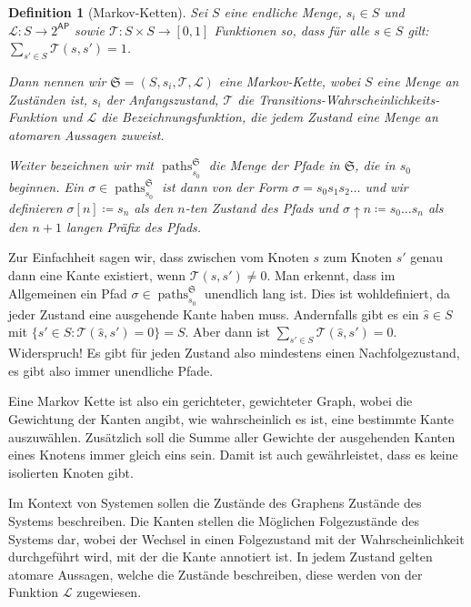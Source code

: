 \documentclass{lni}
\theoremstyle{def_style}
\newtheorem{definition}{Definition}[section]
\theoremstyle{break}
\newcommand{\paths}[2]{\operatorname{paths}^{#1}_{#2}}
\begin{document}
\begin{definition}[Markov-Ketten]
	Sei $S$ eine endliche Menge, $s_i\in S$ und $\mathcal{L}:S\to 2^\mathsf{AP}$ sowie $\mathcal{T}:S\times S \to [0,1]$ Funktionen so, dass für alle $s\in S$ gilt: $\sum_{s'\in S}\mathcal{T}(s,s')=1$.
	
	Dann nennen wir $\mathfrak{S}=(S, s_i, \mathcal{T}, \mathcal{L})$ eine Markov-Kette, wobei $S$ eine Menge an Zuständen ist, $s_i$ der Anfangszustand, $\mathcal{T}$ die Transitions-Wahrscheinlichkeits-Funktion und $\mathcal{L}$ die Bezeichnungsfunktion, die jedem Zustand eine Menge an atomaren Aussagen zuweist.
	
	Weiter bezeichnen wir mit $\paths{\mathfrak{S}}{s_0}$ die Menge der Pfade in $\mathfrak{S}$, die in $s_0$ beginnen. 
	Ein $\sigma\in \paths{\mathfrak{S}}{s_0}$ ist dann von der Form $\sigma=s_0s_1s_2\dots$ und wir definieren $\sigma[n]\coloneqq s_n$ als den $n$-ten Zustand des Pfads und $\sigma\uparrow n\coloneqq s_0\dots s_n$ als den $n+1$ langen Präfix des Pfads.
	\cite{hansson1994logic}
\end{definition}

Zur Einfachheit sagen wir, dass zwischen vom Knoten $s$ zum Knoten $s'$ genau dann eine Kante existiert, wenn $\mathcal{T}(s, s') \neq 0$.
Man erkennt, dass im Allgemeinen ein Pfad $\sigma\in \paths{\mathfrak{S}}{s_0}$ unendlich lang ist. 
Dies ist wohldefiniert, da jeder Zustand eine ausgehende Kante haben muss. Andernfalls gibt es ein $\hat s\in S$ mit $\{s'\in S :\mathcal{T}(\hat s, s')= 0 \} = S$. Aber dann ist $\sum_{s'\in S}\mathcal{T}(\hat s, s')=0$. Widerspruch! Es gibt für jeden Zustand also mindestens einen Nachfolgezustand, es gibt also immer unendliche Pfade.

Eine Markov Kette ist also ein gerichteter, gewichteter Graph, wobei die Gewichtung der Kanten angibt, wie wahrscheinlich es ist, eine bestimmte Kante auszuwählen. Zusätzlich soll die Summe aller Gewichte der ausgehenden Kanten eines Knotens immer gleich eins sein. Damit ist auch gewährleistet, dass es keine isolierten Knoten gibt.

Im Kontext von Systemen sollen die Zustände des Graphens Zustände des Systems beschreiben. Die Kanten stellen die Möglichen Folgezustände des Systems dar, wobei der Wechsel in einen Folgezustand mit der Wahrscheinlichkeit durchgeführt wird, mit der die Kante annotiert ist. In jedem Zustand gelten atomare Aussagen, welche die Zustände beschreiben, diese werden von der Funktion $\mathcal{L}$ zugewiesen.
\end{document}
